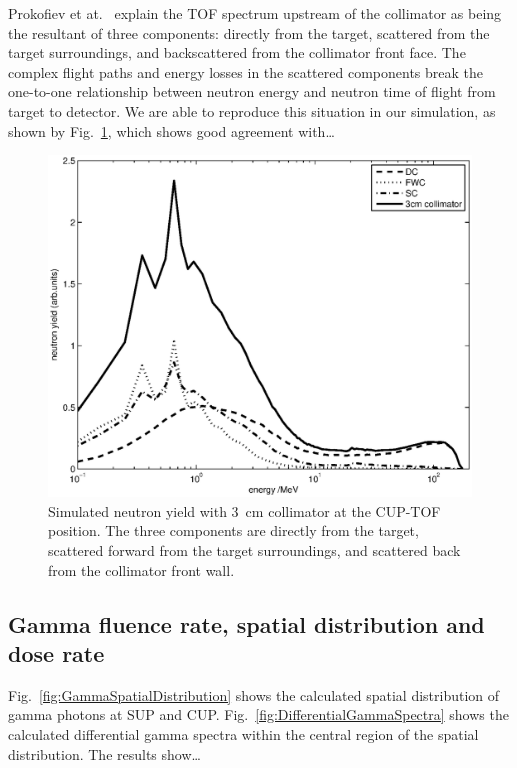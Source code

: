 \documentclass[11pt,a4paper]{IEEEtran}
\let\MYoriglatexcaption\caption
\renewcommand{\caption}[2][\relax]{\MYoriglatexcaption[#2]{#2}}
\begin{document}
Prokofiev et at.~\cite{Prokofiev14} explain the TOF spectrum upstream of the collimator as being the resultant of three components: directly from the target, scattered from the target surroundings, and backscattered from the collimator front face.
The complex flight paths and energy losses in the scattered components break the one-to-one relationship between neutron energy and neutron time of flight from target to detector.
We are able to reproduce this situation in our simulation, as shown by Fig.~\ref{fig:TOF3Componentslinear}, which shows good agreement with\ldots
{}

\begin{figure}[t]
	\centering
	\includegraphics[width=\columnwidth]{TOF3Componentslinear.eps}
	\caption{
        Simulated neutron yield with \SI{3}{\cm} collimator at the CUP-TOF position.
        The three components are directly from the target, scattered forward from the target surroundings, and scattered back from the collimator front wall.
    }
	\label{fig:TOF3Componentslinear}
\end{figure}

\subsection{Gamma fluence rate, spatial distribution and dose rate}
Fig.~\ref{fig:GammaSpatialDistribution} shows the calculated spatial distribution of gamma photons at SUP and CUP.
Fig.~\ref{fig:DifferentialGammaSpectra} shows the calculated differential gamma spectra within the central region of the spatial distribution.
The results show\ldots
{}
\end{document}
